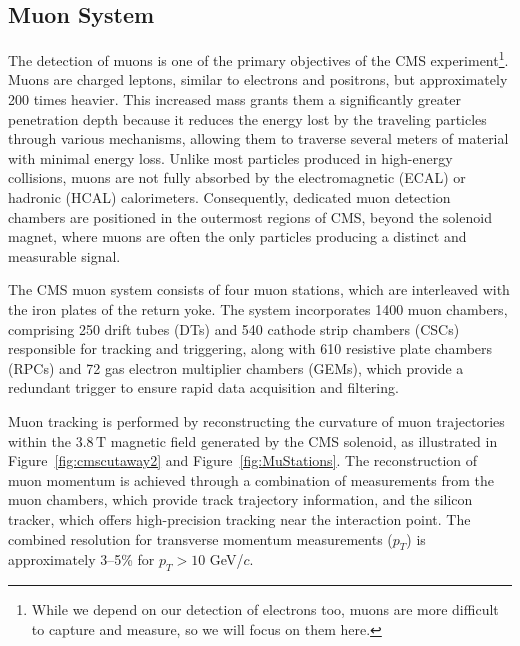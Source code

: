 
\subsection{Muon System}

The detection of muons is one of the primary objectives of the CMS experiment\footnote{While we depend on our detection of electrons too, muons are more difficult to capture and measure, so we will focus on them here.}. Muons are charged leptons, similar to electrons and positrons, but approximately 200 times heavier. This increased mass grants them a significantly greater penetration depth because it reduces the energy lost by the traveling particles through various mechanisms, allowing them to traverse several meters of material with minimal energy loss. Unlike most particles produced in high-energy collisions, muons are not fully absorbed by the electromagnetic (ECAL) or hadronic (HCAL) calorimeters. Consequently, dedicated muon detection chambers are positioned in the outermost regions of CMS, beyond the solenoid magnet, where muons are often the only particles producing a distinct and measurable signal.

The CMS muon system consists of four muon stations, which are interleaved with the iron plates of the return yoke. The system incorporates 1400 muon chambers, comprising 250 drift tubes (DTs) and 540 cathode strip chambers (CSCs) responsible for tracking and triggering, along with 610 resistive plate chambers (RPCs) and 72 gas electron multiplier chambers (GEMs), which provide a redundant trigger to ensure rapid data acquisition and filtering.

Muon tracking is performed by reconstructing the curvature of muon trajectories within the $3.8\,\mathrm{T}$ magnetic field generated by the CMS solenoid, as illustrated in Figure~\ref{fig:cmscutaway2} and Figure~\ref{fig:MuStations}. The reconstruction of muon momentum is achieved through a combination of measurements from the muon chambers, which provide track trajectory information, and the silicon tracker, which offers high-precision tracking near the interaction point. The combined resolution for transverse momentum measurements (\( p_T \)) is approximately 3--5\% for \( p_T > 10 \) GeV/\( c \).

